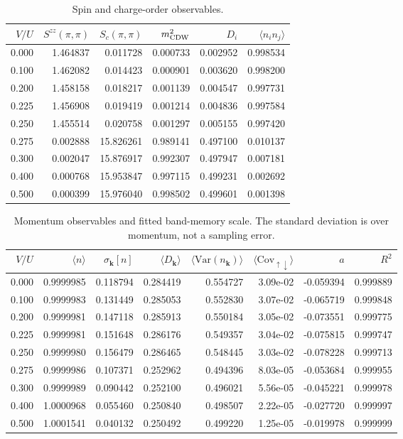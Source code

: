 \documentclass[10pt]{article}
\newcommand{\vk}{\mathbf{k}}
\begin{document}
\begin{table}[!htbp]
\centering\scriptsize
\caption{Spin and charge-order observables.}
\begin{tabular}{rrrrrr}
\toprule
$V/U$ & $S^{zz}(\pi,\pi)$ & $S_c(\pi,\pi)$ & $m_{\rm CDW}^2$ & $D_i$ &
$\langle n_i n_j\rangle$\\
\midrule
0.000 & 1.464837 & 0.011728 & 0.000733 & 0.002952 & 0.998534 \\
0.100 & 1.462082 & 0.014423 & 0.000901 & 0.003620 & 0.998200 \\
0.200 & 1.458158 & 0.018217 & 0.001139 & 0.004547 & 0.997731 \\
0.225 & 1.456908 & 0.019419 & 0.001214 & 0.004836 & 0.997584 \\
0.250 & 1.455514 & 0.020758 & 0.001297 & 0.005155 & 0.997420 \\
0.275 & 0.002888 & 15.826261 & 0.989141 & 0.497100 & 0.010137 \\
0.300 & 0.002047 & 15.876917 & 0.992307 & 0.497947 & 0.007181 \\
0.400 & 0.000768 & 15.953847 & 0.997115 & 0.499231 & 0.002692 \\
0.500 & 0.000399 & 15.976040 & 0.998502 & 0.499601 & 0.001398 \\
\bottomrule
\end{tabular}
\end{table}

\begin{table}[!htbp]
\centering\scriptsize
\caption{Momentum observables and fitted band-memory scale.  The standard deviation
is over momentum, not a sampling error.}
\begin{tabular}{rrrrrrrr}
\toprule
$V/U$ & $\langle n\rangle$ & $\sigma_{\vk}[n]$ & $\langle D_{\vk}\rangle$ &
$\langle\mathrm{Var}(n_{\vk})\rangle$ & $\langle\mathrm{Cov}_{\uparrow\downarrow}\rangle$ & $a$ & $R^2$\\
\midrule
0.000 & 0.9999985 & 0.118794 & 0.284419 & 0.554727 & 3.09e-02 & -0.059394 & 0.999889 \\
0.100 & 0.9999983 & 0.131449 & 0.285053 & 0.552830 & 3.07e-02 & -0.065719 & 0.999848 \\
0.200 & 0.9999981 & 0.147118 & 0.285913 & 0.550184 & 3.05e-02 & -0.073551 & 0.999775 \\
0.225 & 0.9999981 & 0.151648 & 0.286176 & 0.549357 & 3.04e-02 & -0.075815 & 0.999747 \\
0.250 & 0.9999980 & 0.156479 & 0.286465 & 0.548445 & 3.03e-02 & -0.078228 & 0.999713 \\
0.275 & 0.9999986 & 0.107371 & 0.252962 & 0.494396 & 8.03e-05 & -0.053684 & 0.999955 \\
0.300 & 0.9999989 & 0.090442 & 0.252100 & 0.496021 & 5.56e-05 & -0.045221 & 0.999978 \\
0.400 & 1.0000968 & 0.055460 & 0.250840 & 0.498507 & 2.22e-05 & -0.027720 & 0.999997 \\
0.500 & 1.0001541 & 0.040132 & 0.250492 & 0.499220 & 1.25e-05 & -0.019978 & 0.999999 \\
\bottomrule
\end{tabular}
\end{table}
\end{document}
